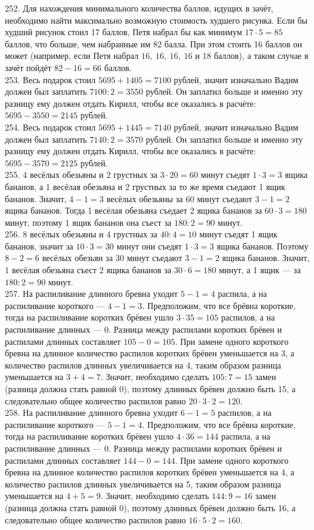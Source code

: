 \documentclass[12pt]{article}
\begin{document}
252. Для нахождения минимального количества баллов, идущих в зачёт, необходимо найти максимально возможную стоимость худшего рисунка. Если бы худший рисунок стоил 17 баллов, Петя набрал бы как минимум $17\cdot5=85$ баллов, что больше, чем набранные им 82 балла. При этом стоить 16 баллов он может (например, если Петя набрал $16,\ 16,\ 16,\ 16$ и 18 баллов), а таком случае в зачёт пойдёт $82-16=66$ баллов.\\
253. Весь подарок стоил $5695+1405=7100$ рублей, значит изначально Вадим должен был заплатить $7100:2=3550$ рублей. Он заплатил больше и именно эту разницу ему должен отдать Кирилл, чтобы все оказались в расчёте: $5695-3550=2145$ рублей.\\
254. Весь подарок стоил $5695+1445=7140$ рублей, значит изначально Вадим должен был заплатить $7140:2=3570$ рублей. Он заплатил больше и именно эту разницу ему должен отдать Кирилл, чтобы все оказались в расчёте: $5695-3570=2125$ рублей.\\
255. 4 весёлых обезьяны и 2 грустных за $3\cdot20=60$ минут съедят $1\cdot3=3$ ящика бананов, а 1 весёлая обезьяна и 2 грустных за то же время съедают 1 ящик бананов. Значит, $4-1=3$ весёлых обезьяны за 60 минут съедают $3-1=2$ ящика бананов. Тогда 1 весёлая обезьяна съедает 2 ящика бананов за $60\cdot3=180$ минут, поэтому 1 ящик бананов она съест за $180:2=90$ минут.\\
256. 8 весёлых обезьяны и 4 грустных за $40:4=10$ минут съедят 1 ящик бананов, значит за $10\cdot3=30$ минут они съедят $1\cdot3=3$ ящика бананов. Поэтому $8-2=6$ весёлых обезьян за 30 минут съедают $3-1=2$ ящика бананов. Значит, 1 весёлая обезьяна съест 2 ящика бананов за $30\cdot6=180$ минут, а 1 ящик --- за $180:2=90$ минут.\\
257. На распиливание длинного бревна уходит $5-1=4$ распила, а на распиливание короткого --- $4-1=3.$ Предположим, что все брёвна короткие, тогда на распиливание коротких брёвен ушло $3\cdot35=105$ распилов, а на распиливание длинных --- 0. Разница между распилами коротких брёвен и распилами длинных составляет $105-0=105.$ При замене одного короткого бревна на длинное количество распилов коротких брёвен уменьшается на 3, а количество распилов длинных увеличивается на 4, таким образом разница уменьшается на $3+4=7.$ Значит, необходимо сделать $105:7=15$ замен (разница должна стать равной 0), поэтому длинных брёвен должно быть 15, а следовательно общее количество распилов равно $20\cdot3\cdot2=120.$\\
258. На распиливание длинного бревна уходит $6-1=5$ распилов, а на распиливание короткого --- $5-1=4.$ Предположим, что все брёвна короткие, тогда на распиливание коротких брёвен ушло $4\cdot36=144$ распила, а на распиливание длинных --- 0. Разница между распилами коротких брёвен и распилами длинных составляет $144-0=144.$ При замене одного короткого бревна на длинное количество распилов коротких брёвен уменьшается на 4, а количество распилов длинных увеличивается на 5, таким образом разница уменьшается на $4+5=9.$ Значит, необходимо сделать $144:9=16$ замен (разница должна стать равной 0), поэтому длинных брёвен должно быть 16, а следовательно общее количество распилов равно $16\cdot5\cdot2=160.$\\
\end{document}
